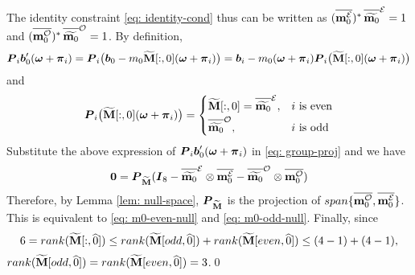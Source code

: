 The identity constraint \eqref{eq: identity-cond} thus can be written as $(\overlinespace{\meven})^*\,\mteven = 1$ and $(\overlinespace{\modd})^*\,\mtodd = 1$. By definition, 
$$ \boldsymbol{P}_i\boldsymbol{b}_0'(\boldsymbol{\omega}+\boldsymbol{\pi}_i) = \boldsymbol{P}_i\big(\boldsymbol{b}_0 - m_0\widetilde{\mathbf{M}}[:,0](\boldsymbol{\omega}+\boldsymbol{\pi}_i)\big)  = \boldsymbol{b}_i - m_0(\boldsymbol{\omega}+\boldsymbol{\pi}_i)\boldsymbol{P}_i\big(\widetilde{\mathbf{M}}[:,0](\boldsymbol{\omega}+\boldsymbol{\pi}_i)\big)$$
and 
$$\V{P}_i\big(\M[:,0](\V{\omega}+\V{\pi}_i)\big) = 
\begin{cases}
   \M[:,0] = \mteven, &  i \text{ is even}\\[.2em]
    \mtodd,              & i \text{ is odd}
\end{cases}
$$
Substitute the above expression of $ \boldsymbol{P}_i\boldsymbol{b}_0'(\boldsymbol{\omega}+\boldsymbol{\pi}_i)$ in \eqref{eq: group-proj} and we have
\begin{align}
\V{0}  
= \V{P}_{\M}(\V{I}_8 -  \mteven\otimes\overline{\meven} - \mtodd\otimes\overline{\modd})
\end{align}
Therefore, by Lemma \ref{lem: null-space}, $\boldsymbol{P}_{\widetilde{\mathbf{M}}}$ is the projection of $span\{\overlinespace{\modd},\overlinespace{\meven}\}$. This is equivalent to \eqref{eq: m0-even-null} and \eqref{eq: m0-odd-null}.
Finally, since $$6 = rank(\widetilde{\mathbf{M}}[:,\widehat{0}]) \leq rank(\widetilde{\mathbf{M}}[odd,\widehat{0}]) + rank(\widetilde{\mathbf{M}}[even,\widehat{0}]) \leq (4-1) + (4-1),$$ $rank(\widetilde{\mathbf{M}}[odd,\widehat{0}]) = rank(\widetilde{\mathbf{M}}[even,\widehat{0}]) = 3$.\qed
